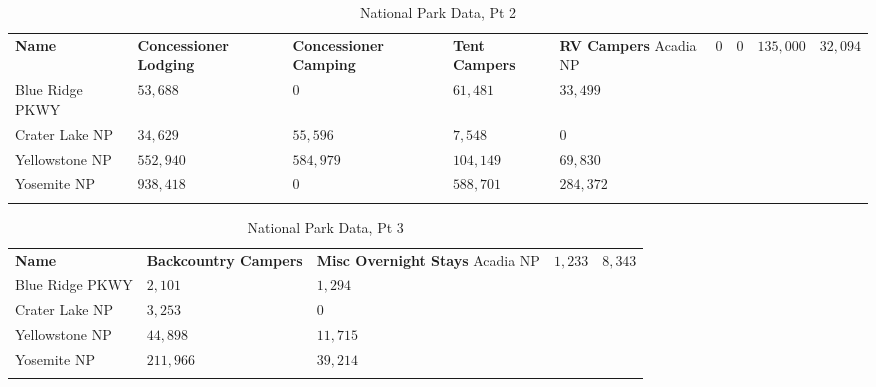 \begin{table}[H]
	{\small
		\begin{longtable}{L{1.25in}L{0.60in}L{0.60in}L{0.60in}L{0.60in}} %
			\textbf{Name} & \textbf{Concessioner Lodging} & \textbf{Concessioner Camping} & \textbf{Tent Campers} & \textbf{RV Campers} \endhead
			\hline
			Acadia NP       & $ 0 $       & $ 0 $       & $ 135,000 $ & $ 32,094 $  \\
			Blue Ridge PKWY & $ 53,688 $  & $ 0 $       & $ 61,481 $  & $ 33,499 $  \\
			Crater Lake NP  & $ 34,629 $  & $ 55,596 $  & $ 7,548 $   & $ 0 $       \\
			Yellowstone NP  & $ 552,940 $ & $ 584,979 $ & $ 104,149 $ & $ 69,830 $  \\
			Yosemite NP     & $ 938,418 $ & $ 0 $       & $ 588,701 $ & $ 284,372 $ \\
			\caption{National Park Data, Pt 2}
			\label{06:tab07}
		\end{longtable}
	}
\end{table}

\begin{table}[H]
	{\small
		\begin{longtable}{L{1.25in}L{0.60in}L{0.60in}} %
			\textbf{Name} & \textbf{Backcountry Campers} & \textbf{Misc Overnight Stays} \endhead
			\hline
			Acadia NP       & $ 1,233 $   & $ 8,343 $  \\
			Blue Ridge PKWY & $ 2,101 $   & $ 1,294 $  \\
			Crater Lake NP  & $ 3,253 $   & $ 0 $      \\
			Yellowstone NP  & $ 44,898 $  & $ 11,715 $ \\
			Yosemite NP     & $ 211,966 $ & $ 39,214 $ \\
			\caption{National Park Data, Pt 3}
			\label{06:tab08}
		\end{longtable}
	}
\end{table}

